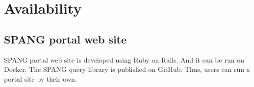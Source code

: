 \documentclass[runningheads]{llncs}
\begin{document}






\section{Availability}

\subsection{SPANG portal web site}
SPANG portal web site is developed using Ruby on Rails. And it can be run on Docker. The SPANG query library is published on GitHub. Thus, users can run a portal site by their own.
\end{document}
